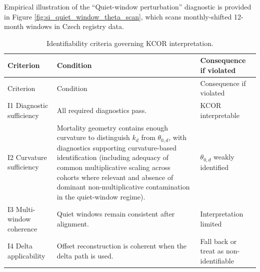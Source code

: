 \documentclass[
]{article}
\begin{document}
Empirical illustration of the ``Quiet-window perturbation'' diagnostic
is provided in Figure \ref{fig:si_quiet_window_theta_scan}, which scans
monthly-shifted 12-month windows in Czech registry data.

\begin{longtable}[]{@{}
  >{\raggedright\arraybackslash}p{}
  >{\raggedright\arraybackslash}p{}
  >{\raggedright\arraybackslash}p{}@{}}
\caption{Identifiability criteria governing KCOR
interpretation.}\label{tbl:si_identifiability}\tabularnewline
\toprule\noalign{}
\begin{minipage}[b]{\linewidth}\raggedright
Criterion
\end{minipage} & \begin{minipage}[b]{\linewidth}\raggedright
Condition
\end{minipage} & \begin{minipage}[b]{\linewidth}\raggedright
Consequence if violated
\end{minipage} \\
\midrule\noalign{}
\endfirsthead
\toprule\noalign{}
\begin{minipage}[b]{\linewidth}\raggedright
Criterion
\end{minipage} & \begin{minipage}[b]{\linewidth}\raggedright
Condition
\end{minipage} & \begin{minipage}[b]{\linewidth}\raggedright
Consequence if violated
\end{minipage} \\
\midrule\noalign{}
\endhead
\bottomrule\noalign{}
\endlastfoot
I1 Diagnostic sufficiency & All required diagnostics pass. & KCOR
interpretable \\
I2 Curvature sufficiency & Mortality geometry contains enough curvature
to distinguish \(k_d\) from \(\theta_{0,d}\), with diagnostics
supporting curvature-based identification (including adequacy of common
multiplicative scaling across cohorts where relevant and absence of
dominant non-multiplicative contamination in the quiet-window regime). &
\(\theta_{0,d}\) weakly identified \\
I3 Multi-window coherence & Quiet windows remain consistent after
alignment. & Interpretation limited \\
I4 Delta applicability & Offset reconstruction is coherent when the
delta path is used. & Fall back or treat as non-identifiable \\

\end{longtable}
\end{document}
